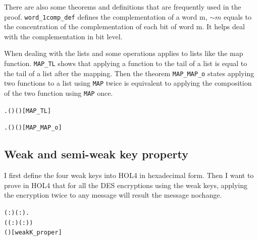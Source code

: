 \documentclass{article}
\begin{document}
There are also some theorems and definitions that are frequently used in the proof. \verb|word_1comp_def| defines the complementation of a word m,
$\sim m$ equals to the concentration of the complementation of each bit of word m. It helps deal with the complementation in
bit level.

When dealing with the lists and some operations applies to lists like the map function. \verb|MAP_TL| shows that applying a function
to the tail of a list is equal to the tail of a list after the mapping. Then the theorem \verb|MAP_MAP_o| states applying two functions
to a list using \verb|MAP| twice is equivalent to applying the composition of the two function using \verb|MAP| once.

\begin{alltt}
\HOLTokenTurnstile{} \HOLSymConst{\HOLTokenForall{}} .   ( ) \HOLSymConst{=}  (  )\hfill{[MAP_TL]}
\end{alltt}

\begin{alltt}
\HOLTokenTurnstile{} \HOLSymConst{\HOLTokenForall{}}  .   (  ) \HOLSymConst{=}  ( \HOLSymConst{\HOLTokenCompose} ) \hfill{[MAP_MAP_o]}
\end{alltt}

\subsection{Weak and semi-weak key property}
I first define the four weak keys into HOL4 in hexadecimal form. Then I want to prove in HOL4 that for all the DES encryptions using
the weak keys, applying the encryption twice to any message will result the message nochange.

\begin{alltt}
\HOLTokenTurnstile{} \HOLSymConst{\HOLTokenForall{}}( :) ( :).
        \HOLSymConst{\HOLTokenConj{}}
       \HOLSymConst{=}
     (( : \HOLTokenMap{} )\HOLSymConst{,}( : \HOLTokenMap{} )) \HOLSymConst{\HOLTokenImp{}}
      ( ) \HOLSymConst{=} \hfill{[weakK_proper]}
\end{alltt}
\end{document}
